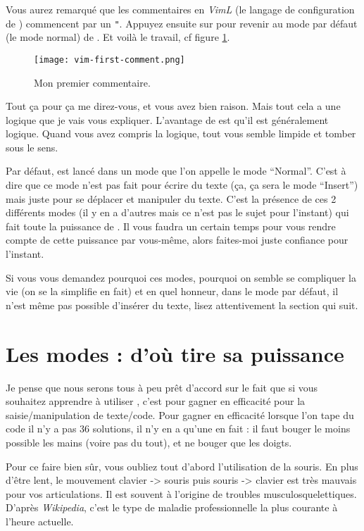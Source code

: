 Vous aurez remarqué que les commentaires en \emph{VimL} (le langage de configuration de \vim) commencent par un \Verb|"|. Appuyez ensuite sur \ttesc pour revenir au mode par défaut (le mode normal) de \vim. Et voilà le travail, cf figure \ref{fig:vim-first-comment}.

\begin{figure}%
  \texttt{[image: vim-first-comment.png]}
  \caption{Mon premier commentaire.}
  \label{fig:vim-first-comment}
\end{figure}

Tout ça pour ça me direz-vous, et vous avez bien raison. Mais tout cela a une logique que je vais vous expliquer. L'avantage de \vim est qu'il est généralement logique. Quand vous avez compris la logique, tout vous semble limpide et tomber sous le sens.

Par défaut, \vim est lancé dans un mode que l'on appelle le mode ``Normal''. C'est à dire que ce mode n'est pas fait pour écrire du texte (ça, ça sera le mode ``Insert'') mais juste pour se déplacer et manipuler du texte. C'est la présence de ces 2 différents modes (il y en a d'autres mais ce n'est pas le sujet pour l'instant) qui fait toute la puissance de \vim. Il vous faudra un certain temps pour vous rendre compte de cette puissance par vous-même, alors faites-moi juste confiance pour l'instant.

Si vous vous demandez pourquoi ces modes, pourquoi on semble se compliquer la vie (on se la simplifie en fait) et en quel honneur, dans le mode par défaut, il n'est même pas possible d'insérer du texte, lisez attentivement la section qui suit.

\section{Les modes : d'où \vim tire sa puissance}\label{sec:modes}

Je pense que nous serons tous à peu prêt d'accord sur le fait que si vous souhaitez apprendre à utiliser \vim, c'est pour gagner en efficacité pour la saisie/manipulation de texte/code. Pour gagner en efficacité lorsque l'on tape du code il n'y a pas 36 solutions, il n'y en a qu'une en fait : il faut bouger le moins possible les mains (voire pas du tout), et ne bouger que les doigts.

Pour ce faire bien sûr, vous oubliez tout d'abord l'utilisation de la souris. En plus d'être lent, le mouvement clavier -> souris puis souris -> clavier est très mauvais pour vos articulations. Il est souvent à l'origine de troubles musculosquelettiques. D'après \emph{Wikipedia}, c'est le type de maladie professionnelle la plus courante à l'heure actuelle.


